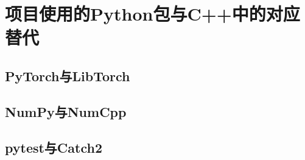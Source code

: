 

\section{项目使用的Python包与C++中的对应替代}\label{sec:python-cpp-packages}


\subsection{PyTorch与LibTorch}\label{subsec:pytorch-libtorch}


\subsection{NumPy与NumCpp}\label{subsec:numpy-numcpp}


\subsection{pytest与Catch2}\label{subsec:pytest-catch2}


